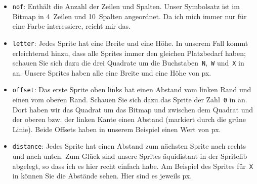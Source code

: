 \begin{itemize}
    \item \texttt{nof}: Enthält die Anzahl der Zeilen und Spalten. Unser Symbolsatz ist im Bitmap in 4~Zeilen und 10~Spalten angeordnet. Da ich mich immer nur für eine Farbe interessiere, reicht mir das.

    \item \texttt{letter}: Jedes Sprite hat eine Breite und eine Höhe. In unserem Fall kommt erleichternd hinzu, dass alle Sprites immer den gleichen Platzbedarf haben; schauen Sie sich dazu die drei Quadrate um die Buchstaben~\texttt{N},~\texttt{W} und~\texttt{X} in  an. Unsere Sprites haben alle eine Breite und eine Höhe von \unit[18]{px}.

    \item \texttt{offset}: Das erste Sprite oben links hat einen Abstand vom linken Rand und einen vom oberen Rand. Schauen Sie sich dazu das Sprite der Zahl~\texttt{0} in  an. Dort haben wir das Quadrat um das Bitmap und zwischen dem Quadrat und der oberen bzw. der linken Kante einen Abstand (markiert durch die grüne Linie). Beide Offsets haben in unserem Beispiel einen Wert von \unit[6]{px}.

    \item \texttt{distance}: Jedes Sprite hat einen Abstand zum nächsten Sprite nach rechts und nach unten. Zum Glück sind unsere Sprites äquidistant in der Spritelib abgelegt, so dass ich es hier recht einfach habe. Am Beispiel des Sprites für~\texttt{X} in  können Sie die Abstände sehen. Hier sind es jeweils \unit[14]{px}.
\end{itemize}


